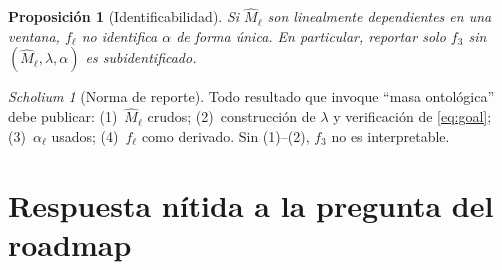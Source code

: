 \documentclass[11pt,a4paper]{article}
\theoremstyle{definition}
\theoremstyle{plain}
\newtheorem{proposition}{Proposici\'on}[section]
\theoremstyle{remark}
\newtheorem{scholium}{Scholium}[section]
\begin{document}
\begin{proposition}[Identificabilidad]
\label{prop:id}
Si $\widehat{M}_\ell$ son linealmente dependientes en una ventana, $f_\ell$
no identifica $\alpha$ de forma \'unica. En particular, reportar solo
$f_3$ sin $(\widehat{M}_\ell,\lambda,\alpha)$ es subidentificado.
\end{proposition}

\begin{scholium}[Norma de reporte]
Todo resultado que invoque ``masa ontológica'' debe publicar:
(1)~$\widehat{M}_\ell$ crudos; (2)~construcci\'on de $\lambda$ y
verificación de \eqref{eq:goal}; (3)~$\alpha_\ell$ usados;
(4)~$f_\ell$ como derivado. Sin (1)--(2), $f_3$ no es interpretable.
\end{scholium}

\section{Respuesta n\'itida a la pregunta del roadmap}
\label{sec:answer}
\end{document}
